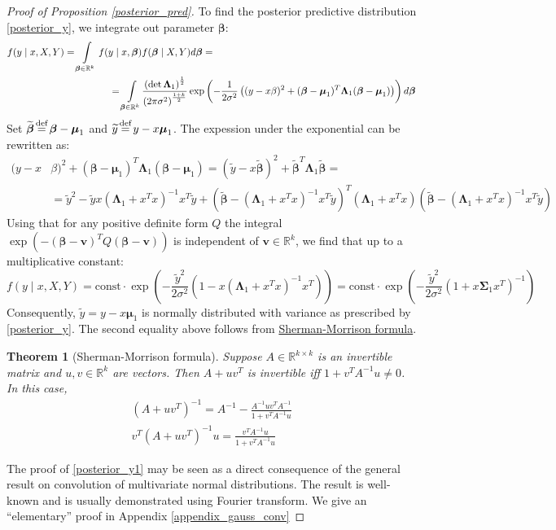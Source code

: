\documentclass[10pt,fleqn]{amsart}
\newtheorem{theorem}{Theorem}[section]
\theoremstyle{definition}
\theoremstyle{remark}
\numberwithin{equation}{section}
\newcommand{\RR}{\mathbb{R}}
\newcommand{\eq}{\stackrel{\mathclap{\normalfont\text{def}}}{=}}
\newcommand{\const}{\text{const}}
\newcommand{\bbeta}{\boldsymbol{\beta}}
\newcommand{\mmu}{\boldsymbol{\mu}}
\newcommand{\SSigma}{\boldsymbol{\Sigma}}
\newcommand{\LLambda}{\boldsymbol{\Lambda}}
\newcommand{\bbetatilde}{\widetilde{\bbeta}}
\newcommand{\ytilde}{\widetilde{y}}
\begin{document}
\begin{proof}[Proof of Proposition \ref{posterior_pred}]
\noindent To find the posterior predictive distribution \ref{posterior_y}, we integrate out parameter $\bbeta$:
\begin{equation*}\begin{split}
f(y\mid x,X,Y)=\int\displaylimits_{\bbeta\in\RR^k}f(y\mid x,\bbeta)&f(\bbeta\mid X,Y)d\bbeta=\\
=\int\displaylimits_{\bbeta\in\RR^k}&\frac {\left(\det\LLambda_1\right)^{\frac 12}}{\left(2\pi\sigma^2\right)^{\frac{1+k}2}}
\exp\left(-\frac 1{2\sigma^2}\left((y-x\beta)^2+(\bbeta-\mmu_1)^T\LLambda_1(\bbeta-\mmu_1)\right)\right)d\bbeta
\end{split}\end{equation*}
Set $\bbetatilde\eq\bbeta-\mmu_1$ and $\ytilde\eq y-x\mmu_1$. The expession under the exponential can be rewritten as:
\begin{equation*}\begin{split}
    (y-x&\beta)^2+(\bbeta-\mmu_1)^T\LLambda_1(\bbeta-\mmu_1)=
    \left(\ytilde-x\bbetatilde\right)^2+\bbetatilde^T\LLambda_1\bbetatilde=\\
    &=\ytilde^2-\ytilde x\left(\LLambda_1+x^Tx\right)^{-1}x^T\ytilde+
    \left(\bbetatilde-\left(\LLambda_1+x^Tx\right)^{-1}x^T\ytilde\right)^T\left(\LLambda_1+x^Tx\right)
    \left(\bbetatilde-\left(\LLambda_1+x^Tx\right)^{-1}x^T\ytilde\right)
\end{split}\end{equation*}
Using that for any positive definite form $Q$ the integral $\exp(-(\bbeta-\boldsymbol{v})^TQ(\bbeta-\boldsymbol{v}))$ is independent of $\boldsymbol{v}\in\RR^k$,
we find that up to a multiplicative constant:
\begin{equation*}
    f(y\mid x, X, Y)=\const\cdot \exp\left(-\frac {\ytilde^2}{2\sigma^2}\left(1-x\left(\LLambda_1+x^Tx\right)^{-1}x^T\right)\right)=
    \const\cdot \exp\left(-\frac {\ytilde^2}{2\sigma^2}\left(1+x\SSigma_1 x^T\right)^{-1}\right)
\end{equation*}
Consequently, $\ytilde=y-x\mmu_1$ is normally distributed with variance as prescribed by \ref{posterior_y}.
The second equality above follows from \href{https://en.wikipedia.org/wiki/Sherman%E2%80%93Morrison_formula}{Sherman-Morrison formula}.
\begin{theorem}[Sherman-Morrison formula]
    Suppose $A\in\RR^{k\times k}$ is an invertible matrix and $u,v\in \RR^k$ are vectors. Then $A+uv^T$  is invertible iff $1+v^TA^{-1}u\neq 0$.
    In this case,
    \begin{align}
        \left(A+uv^T\right)^{-1}=A^{-1}-\frac{A^{-1}uv^TA^{-1}}{1+v^TA^{-1}u}\\
        v^T\left(A+uv^T\right)^{-1}u=\frac{v^TA^{-1}u}{1+v^TA^{-1}u}
    \end{align}
\end{theorem}
The proof of \ref{posterior_y1} may be seen as a direct consequence of the general result on convolution of multivariate normal distributions.
The result is well-known and is usually demonstrated using Fourier transform.
We give an ``elementary'' proof in Appendix \ref{appendix_gauss_conv}
\end{proof}
\end{document}
